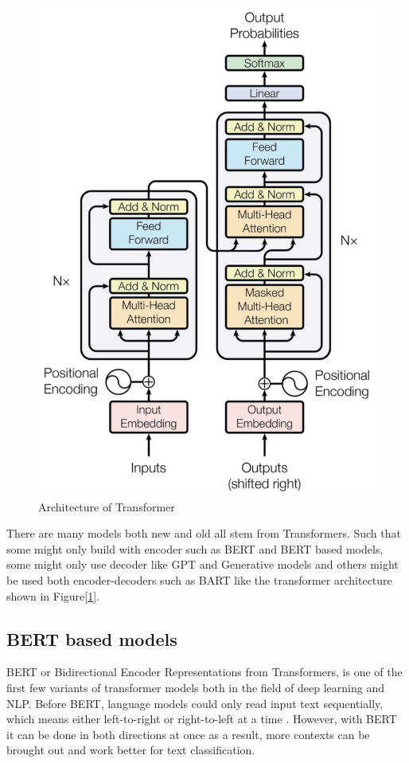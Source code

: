  \begin{figure}[ht]
    \centerline{\includegraphics[scale=0.11]{Figures/encoder-decoder.jpg}}
    \caption{Architecture of Transformer}
    \label{fig:encoder-decoder}
 \end{figure}

There are many models both new and old all stem from Transformers. Such that some might only build with encoder such as BERT and BERT based models, some might only use decoder like GPT and Generative models and others might be used both encoder-decoders such as BART like the transformer architecture shown in Figure[\ref{fig:encoder-decoder}].

\subsection{BERT based models}
BERT or Bidirectional Encoder Representations from Transformers, is one of the first few variants of transformer models both in the field of deep learning and NLP.
Before BERT, language models could only read input text sequentially, which means either left-to-right or right-to-left at a time \cite{Hashemi-Pour_Lutkevich_2024}.
However, with BERT it can be done in both directions at once \cite{Hashemi-Pour_Lutkevich_2024} as a result, more contexts can be brought out and work better for text classification.

